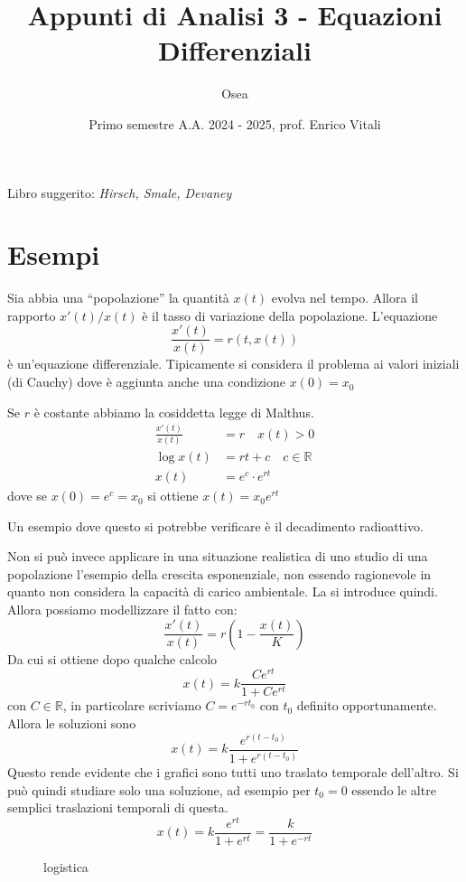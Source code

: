 
\title{Appunti di Analisi 3 \-- Equazioni Differenziali}
\author{Osea}
\date{Primo semestre A.A. 2024 \-- 2025, prof. Enrico Vitali}


\maketitle
Libro suggerito: \emph{Hirsch, Smale, Devaney}

\tableofcontents
\newpage

\setcounter{section}{-1}
\section{Esempi}
Sia abbia una ``popolazione'' la quantità $x(t)$ evolva nel tempo. Allora il
rapporto \(x'(t) / x(t)\) è il tasso di variazione della popolazione.
L'equazione
\[
    \frac{x'(t)}{x(t)} = r(t, x(t))
\]
è un'equazione differenziale. Tipicamente si considera il problema ai valori
iniziali (di Cauchy) dove è aggiunta anche una condizione \(x(0) = x_{0}\) 

\begin{example}[Malthus]
    Se \(r\) è costante abbiamo la cosiddetta legge di Malthus.
    \begin{align*}
        \frac{x'(t)}{x(t)} &= r \quad x(t) > 0 \\
        \log x(t) &= rt + c \quad c \in \mathbb{R} \\
        x(t) &= e^{c} \cdot e^{rt}
    \end{align*}
    dove se \(x(0) = e^{c} = x_{0}\) si ottiene \(x(t) = x_{0} e^{rt}\) 

    Un esempio dove questo si potrebbe verificare è il decadimento radioattivo.
\end{example}

\begin{example}[Logistica]
    Non si può invece applicare in una situazione realistica di uno studio di
    una popolazione l'esempio della crescita esponenziale, non essendo
    ragionevole in quanto non considera la capacità di carico ambientale. La si
    introduce quindi. Allora possiamo modellizzare il fatto con:
    \[
        \frac{x'(t)}{x(t)} = r\left(1 - \frac{x(t)}{K}\right)
    \]
    Da cui si ottiene dopo qualche calcolo
    \[
        x(t) = k \frac{Ce^{rt}}{1 + Ce^{rt}}
    \]
    con \(C \in \mathbb{R}\), in particolare scriviamo \(C = e^{-rt_{0}}\) con
    \(t_{0}\) definito opportunamente. Allora le soluzioni sono 
    \[
        x(t) = k \frac{e^{r(t-t_{0})}}{1 + e^{r(t-t_{0})}}
    \]
    Questo rende evidente che i grafici sono tutti uno traslato temporale
    dell'altro. Si può quindi studiare solo una soluzione, ad esempio per
    \(t_{0}=0\) essendo le altre semplici traslazioni temporali di questa.
    \[
        x(t) = k \frac{e^{rt}}{1 + e^{rt}} = \frac{k}{1 + e^{-rt}}
    \]
\begin{figure}[ht]
    \centering
    \caption{logistica}\label{fig:logistica}
\end{figure}
\end{example}

